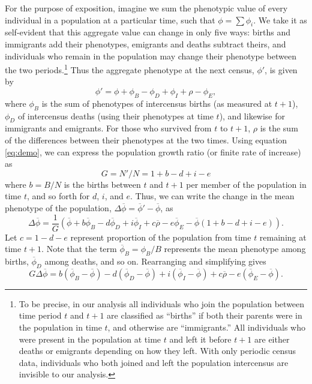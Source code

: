 \documentclass[11pt]{article}
\begin{document}
For the purpose of exposition, imagine we sum the phenotypic value of every individual in a population at a particular time, such that $\phi = \sum \phi_i$.  We take it as self-evident that this aggregate value can change in only five ways: births and immigrants add their phenotypes, emigrants and deaths subtract theirs, and individuals who remain in the population may change their phenotype between the two periods.\footnote{To be precise, in our analysis all individuals who join the population between time period $t$ and $t+1$ are classified as ``births'' if both their parents were in the population in time $t$, and otherwise are ``immigrants.''  All individuals who were present in the population at time $t$ and left it before $t+1$ are either deaths or emigrants depending on how they left.  With only periodic census data, individuals who both joined and left the population intercensus are invisible to our analysis.}  Thus the aggregate phenotype at the next census, $\phi'$, is given by
  \[\phi' = \phi + \phi_B - \phi_D  + \phi_I + \rho - \phi_E, 
\]
where $\phi_B$ is the sum of phenotypes of intercensus births (as measured at $t+1$), $\phi_D$ of intercensus deaths (using their phenotypes at time $t$), and likewise for immigrants and emigrants.  For those who survived from $t$ to $t+1$, $\rho$ is the sum of the differences between their phenotypes at the two times.  Using equation \ref{eq:demo}, we can express the population growth ratio (or finite rate of increase) as 
  \[G = N'/N  = 1 + b - d + i - e
\]
where $b=B/N$ is the births between $t$ and $t+1$ per member of the population in time $t$, and so forth for $d$, $i$, and $e$.  Thus, we can write the change in the mean phenotype of the population, $\Delta \overline{\phi} = \overline{\phi}' - \overline{\phi}$, as
  \[\Delta \overline{\phi} = \frac{1}{G}\left(\overline{\phi} + b\overline{\phi}_B - d\overline{\phi}_D + i\overline{\phi}_I + c\overline{\rho} - e\overline{\phi}_E - \overline{\phi}(1 + b - d + i - e)\right).
\]
Let $c=1-d-e$ represent proportion of the population from time $t$ remaining at time $t+1$.  Note that the term $\overline{\phi}_B= \phi_B/B$ represents the mean phenotype among births, $\overline{\phi}_D$ among deaths, and so on.  Rearranging and simplifying gives 
\begin{equation} \label{eq:BDICE}
G \Delta \overline{\phi} =  b(\overline{\phi}_B - \overline{\phi}) - d(\overline{\phi}_D - \overline{\phi}) + i(\overline{\phi}_I - \overline{\phi}) + c \overline{\rho} - e(\overline{\phi}_E - \overline{\phi}).
\end{equation}
\end{document}
